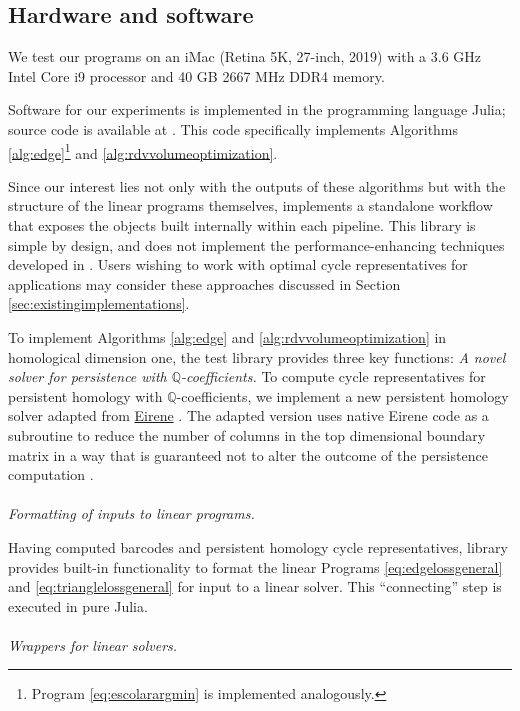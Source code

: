 \documentclass[11pt,onecolumn]{article}
\newcommand{\Q}{\mathbb{Q}}
\newcommand{\se}{Section }
\newcommand{\pr}{Program }
\theoremstyle{plain}
\theoremstyle{definition}
\begin{document}
\subsection{Hardware and software}
\label{subsec:hardwaresoftware}

We test our programs on an iMac (Retina 5K, 27-inch, 2019) with a 3.6 GHz Intel Core i9 processor and 40 GB 2667 MHz DDR4 memory.


Software for our experiments is implemented in the programming language Julia; source code is available at \cite{li_thompson}.  This code specifically implements Algorithms \ref{alg:edge}\footnote{ \pr \eqref{eq:escolarargmin} is implemented analogously.} and \ref{alg:rdvvolumeoptimization}.


Since our interest lies not only with the outputs of these algorithms but with the structure of the linear programs themselves, \cite{li_thompson} implements a standalone workflow that exposes the objects built internally within each pipeline.  This library is simple by design, and does not implement the performance-enhancing techniques  developed in \cite{Escolar2016, Obayashi2018}. Users wishing to work with optimal cycle representatives for applications may consider these approaches 
discussed in \se \ref{sec:existingimplementations}.


To implement  Algorithms \ref{alg:edge} and \ref{alg:rdvvolumeoptimization} in homological dimension one, the test library \cite{li_thompson} provides three key functions:  \emph{A novel solver for persistence with $\Q$-coefficients.} To compute cycle representatives for persistent homology with $\Q$-coefficients, we implement a new persistent homology solver adapted from  \url{Eirene}  \cite{eirenecode}.  The adapted version uses native Eirene code as a subroutine to reduce the number of columns in the top dimensional boundary matrix in a way that is guaranteed not to alter the outcome of the persistence computation \cite{eirene}.
\\
\\
\noindent\emph{Formatting of inputs to linear programs.} 

Having computed barcodes and persistent homology cycle representatives, library \cite{li_thompson}  provides built-in functionality to format the linear Programs \eqref{eq:edgelossgeneral} and \eqref{eq:trianglelossgeneral} for input to a linear solver.  This ``connecting'' step is executed in pure Julia. 
\\
\\
\noindent \emph{Wrappers for linear solvers.} \label{linear solvers} 
\end{document}
